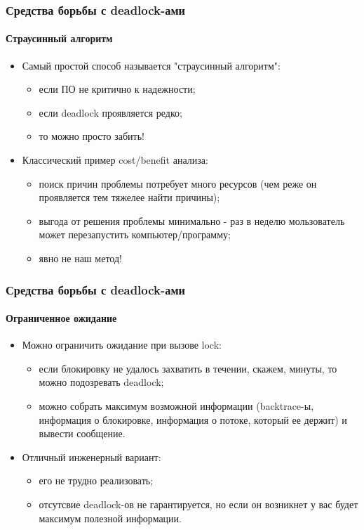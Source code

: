 \begin{frame}
\frametitle{Средства борьбы с deadlock-ами}
\framesubtitle{Страусинный алгоритм}
\begin{itemize}
  \item Самый простой способ называется "страусинный алгоритм":
  \begin{itemize}
    \item если ПО не критично к надежности;
    \item если deadlock проявляется редко;
    \item то можно просто забить!
  \end{itemize}
  \item Классический пример cost/benefit анализа:
  \begin{itemize}
    \item поиск причин проблемы потребует много ресурсов (чем реже он
    проявляется тем тяжелее найти причины);
    \item выгода от решения проблемы минимально - раз в неделю мользователь
    может перезапустить компьютер/программу;
    \item явно не наш метод!
  \end{itemize}
\end{itemize}
\end{frame}

\begin{frame}
\frametitle{Средства борьбы с deadlock-ами}
\framesubtitle{Ограниченное ожидание}
\begin{itemize}
  \item Можно ограничить ожидание при вызове lock:
  \begin{itemize}
    \item если блокировку не удалось захватить в течении, скажем, минуты, то
    можно подозревать deadlock;
    \item можно собрать максимум возможной информации (backtrace-ы, информация
    о блокировке, информация о потоке, который ее держит) и вывести сообщение.
  \end{itemize}
  \item Отличный инженерный вариант:
  \begin{itemize}
    \item его не трудно реализовать;
    \item отсутсвие deadlock-ов не гарантируется, но если он возникнет у вас
    будет максимум полезной информации.
  \end{itemize}
\end{itemize}
\end{frame}

